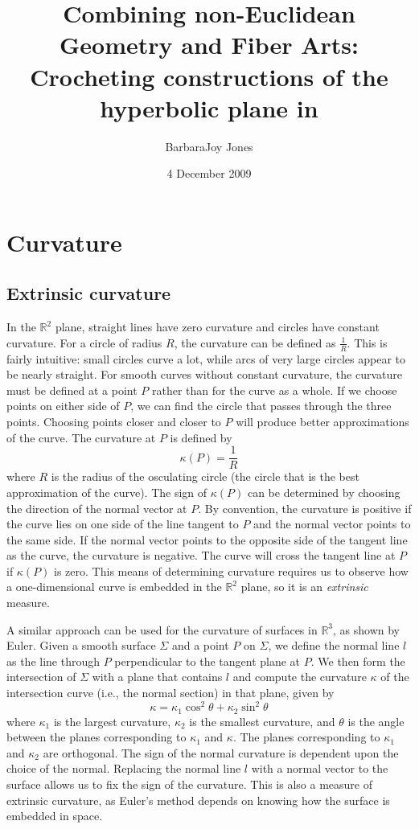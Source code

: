 \documentclass[letterpaper,titlepage]{article}
\title{Combining non-Euclidean Geometry and Fiber Arts:\\
\bigskip
\Large{Crocheting constructions of the hyperbolic plane in \esp}}
\author{BarbaraJoy Jones}
\date{4 December 2009}
\newcommand{\esp}{$\mathbb{R}^3$}
\begin{document}
\maketitle


\section{Curvature}
\subsection{Extrinsic curvature}
In the $\mathbb{R}^2$ plane, straight lines have zero curvature and circles have constant curvature.
For a circle of radius $R$, the curvature can be defined as $\frac{1}{R}$.
This is fairly intuitive: small circles curve a lot, while arcs of very large circles appear to be nearly straight.\cite{adventures}
For smooth curves without constant curvature, the curvature must be defined at a point $P$ rather than for the curve as a whole.
If we choose points on either side of $P$, we can find the circle that passes through the three points.
Choosing points closer and closer to $P$ will produce better approximations of the curve.
The curvature at $P$ is defined by
\begin{equation}
\kappa(P) = \frac{1}{R}
\end{equation}
where $R$ is the radius of the osculating circle (the circle that is the best approximation of the curve).
The sign of $\kappa(P)$ can be determined by choosing the direction of the normal vector at $P$.
By convention, the curvature is positive if the curve lies on one side of the line tangent to $P$ and the normal vector points to the same side.
If the normal vector points to the opposite side of the tangent line as the curve, the curvature is negative.
The curve will cross the tangent line at $P$ if $\kappa(P)$ is zero.\cite{singer}
This means of determining curvature requires us to observe how a one-dimensional curve is embedded in the $\mathbb{R}^2$ plane, so it is an \emph{extrinsic} measure.

A similar approach can be used for the curvature of surfaces in \esp, as shown by Euler.
Given a smooth surface $\Sigma$ and a point $P$ on $\Sigma$, we define the normal line $l$ as the line through $P$ perpendicular to the tangent plane at $P$.
We then form the intersection of $\Sigma$ with a plane that contains $l$ and compute the curvature $\kappa$ of the intersection curve (i.e., the normal section) in that plane, given by
\begin{equation}
\kappa = \kappa_1 \cos^2 \theta + \kappa_2 \sin^2 \theta
\label{euler}
\end{equation}
where $\kappa_1$ is the largest curvature, $\kappa_2$ is the smallest curvature, and $\theta$ is the angle between the planes corresponding to $\kappa_1$ and $\kappa$.
The planes corresponding to $\kappa_1$ and $\kappa_2$ are orthogonal.
The sign of the normal curvature is dependent upon the choice of the normal.
Replacing the normal line $l$ with a normal vector to the surface allows us to fix the sign of the curvature.\cite{singer}
This is also a measure of extrinsic curvature, as Euler's method depends on knowing how the surface is embedded in space.\cite{adventures}
\end{document}
